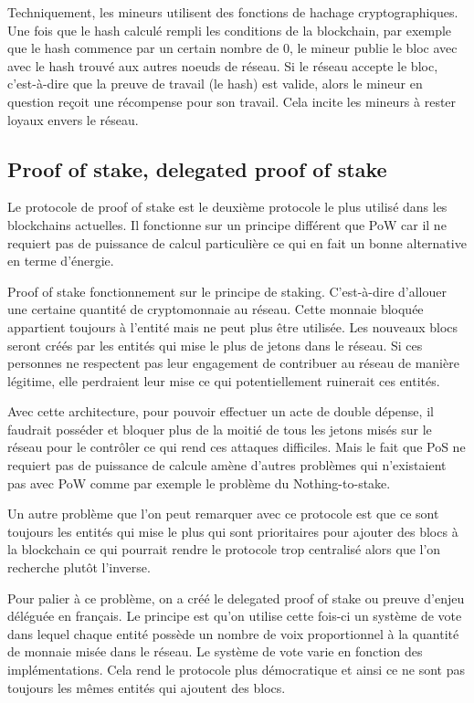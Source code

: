 Techniquement, les mineurs utilisent des fonctions de hachage cryptographiques. Une fois que le hash calculé rempli les conditions de la blockchain, par exemple que le hash commence par un certain nombre de 0, le mineur publie le bloc avec avec le hash trouvé aux autres noeuds de réseau. Si le réseau accepte le bloc, c'est-à-dire que la preuve de travail (le hash) est valide, alors le mineur en question reçoit une récompense pour son travail. Cela incite les mineurs à rester loyaux envers le réseau.

\subsection{Proof of stake, delegated proof of stake}

Le protocole de proof of stake est le deuxième protocole le plus utilisé dans les blockchains actuelles. Il fonctionne sur un principe différent que PoW car il ne requiert pas de puissance de calcul particulière ce qui en fait un bonne alternative en terme d'énergie.

Proof of stake fonctionnement sur le principe de staking. C'est-à-dire d'allouer une certaine quantité de cryptomonnaie au réseau. Cette monnaie bloquée appartient toujours à l'entité mais ne peut plus être utilisée. Les nouveaux blocs seront créés par les entités qui mise le plus de jetons dans le réseau. Si ces personnes ne respectent pas leur engagement de contribuer au réseau de manière légitime, elle perdraient leur mise ce qui potentiellement ruinerait ces entités. 

Avec cette architecture, pour pouvoir effectuer un acte de double dépense, il faudrait posséder et bloquer plus de la moitié de tous les jetons misés sur le réseau pour le contrôler ce qui rend ces attaques difficiles. Mais le fait que PoS ne requiert pas de puissance de calcule amène d'autres problèmes qui n'existaient pas avec PoW comme par exemple le problème du Nothing-to-stake.

Un autre problème que l'on peut remarquer avec ce protocole est que ce sont toujours les entités qui mise le plus qui sont prioritaires pour ajouter des blocs à la blockchain ce qui pourrait rendre le protocole trop centralisé alors que l'on recherche plutôt l'inverse. 

Pour palier à ce problème, on a créé le delegated proof of stake ou preuve d'enjeu déléguée en français. Le principe est qu'on utilise cette fois-ci un système de vote dans lequel chaque entité possède un nombre de voix proportionnel à la quantité de monnaie misée dans le réseau. Le système de vote varie en fonction des implémentations. Cela rend le protocole plus démocratique et ainsi ce ne sont pas toujours les mêmes entités qui ajoutent des blocs.

